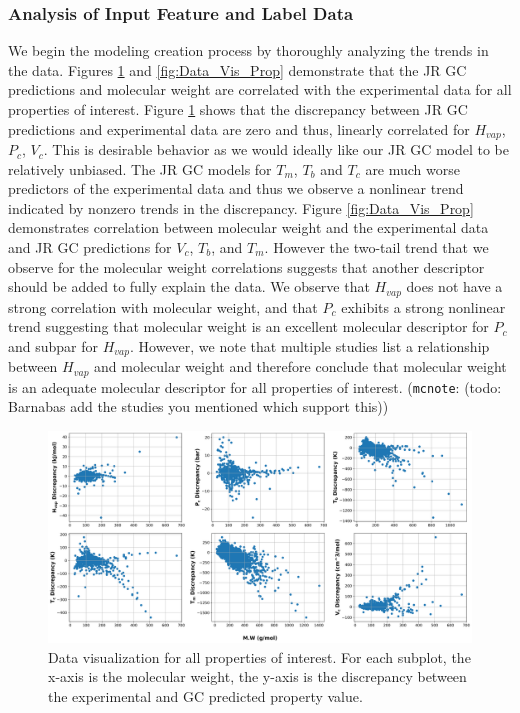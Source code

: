 \documentclass[journal=jacsat,manuscript=article]{achemso}
\newcommand{\mcnote}[1]{{\color{Plum} (\texttt{mcnote}: #1)}}
\begin{document}
\subsubsection{Analysis of Input Feature and Label Data}
We begin the modeling creation process by thoroughly analyzing the trends in the data. Figures \ref{fig:Data_Vis_Disc} and \ref{fig:Data_Vis_Prop} demonstrate that the JR GC predictions and molecular weight are correlated with the experimental data for all properties of interest. Figure \ref{fig:Data_Vis_Disc} shows that the discrepancy between JR GC predictions and experimental data are zero and thus, linearly correlated for $H_{vap}$, $P_c$, $V_c$. This is desirable behavior as we would ideally like our JR GC model to be relatively unbiased. The JR GC models for $T_m$, $T_b$ and $T_c$ are much worse predictors of the experimental data and thus we observe a nonlinear trend indicated by nonzero trends in the discrepancy. Figure \ref{fig:Data_Vis_Prop} demonstrates correlation between molecular weight and the experimental data and JR GC predictions for $V_c$, $T_b$, and $T_m$. However the two-tail trend that we observe for the molecular weight correlations suggests that another descriptor should be added to fully explain the data. We observe that $H_{vap}$ does not have a strong correlation with molecular weight, and that $P_c$ exhibits a strong nonlinear trend suggesting that molecular weight is an excellent molecular descriptor for $P_c$ and subpar for $H_{vap}$. However, we note that multiple studies list a relationship between $H_{vap}$ and molecular weight and therefore conclude that molecular weight is an adequate molecular descriptor for all properties of interest. \mcnote{(todo: Barnabas add the studies you mentioned which support this)}

\begin{figure}[H]
    \centering
    \includegraphics[width=\textwidth]{"./MW_vs_Disc.png"} %
    \caption{Data visualization for all properties of interest. For each subplot, the x-axis is the molecular weight, the y-axis is the discrepancy between the experimental and GC predicted property value.}
    \label{fig:Data_Vis_Disc}
\end{figure}
\end{document}
